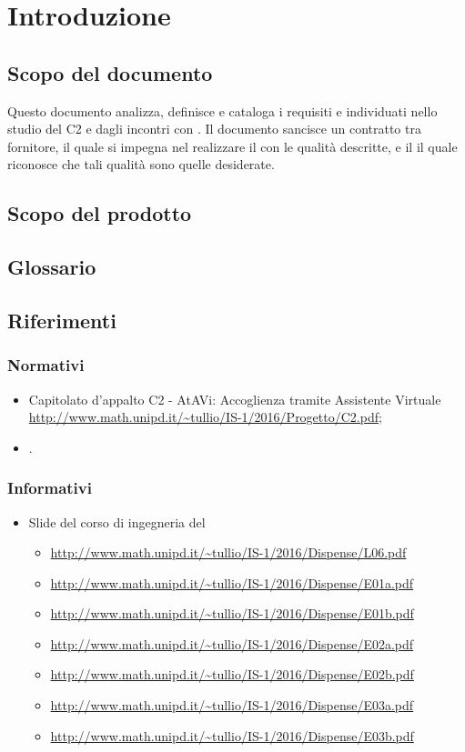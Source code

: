 \section{Introduzione}
 \subsection{Scopo del documento}
 Questo documento analizza, definisce e cataloga i requisiti e  individuati nello studio del  C2 e dagli incontri con \PROPONENTE. 
 Il documento sancisce un contratto tra fornitore, il quale si impegna nel realizzare il  con le qualità descritte,  e il  il quale riconosce che tali qualità sono quelle desiderate. 
 \subsection{Scopo del prodotto}
 \SCOPO
 \subsection{Glossario}
 \GLOSSARIO
 \subsection{Riferimenti}
  \subsubsection{Normativi}
  \begin{itemize}
  	\item Capitolato d'appalto C2 - AtAVi: Accoglienza tramite Assistente Virtuale \\
  	\url{http://www.math.unipd.it/~tullio/IS-1/2016/Progetto/C2.pdf};
    \item \NPdoc.
  \end{itemize}
  \subsubsection{Informativi}
    \begin{itemize}
    	\item Slide del corso di ingegneria del 
    	\begin{itemize}
    		\item \url{http://www.math.unipd.it/~tullio/IS-1/2016/Dispense/L06.pdf}
    		\item \url{http://www.math.unipd.it/~tullio/IS-1/2016/Dispense/E01a.pdf}
    		\item \url{http://www.math.unipd.it/~tullio/IS-1/2016/Dispense/E01b.pdf}
    		\item \url{http://www.math.unipd.it/~tullio/IS-1/2016/Dispense/E02a.pdf}
    		\item \url{http://www.math.unipd.it/~tullio/IS-1/2016/Dispense/E02b.pdf}
    		\item \url{http://www.math.unipd.it/~tullio/IS-1/2016/Dispense/E03a.pdf}
    		\item \url{http://www.math.unipd.it/~tullio/IS-1/2016/Dispense/E03b.pdf}
    	\end{itemize}
    \end{itemize}